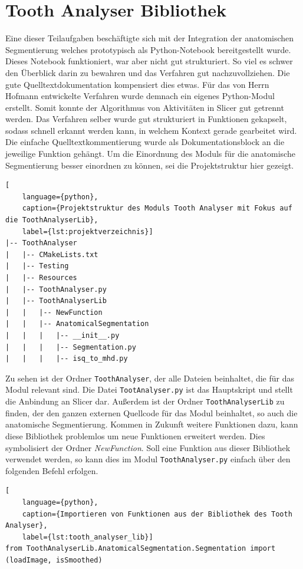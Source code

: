 \section{Tooth Analyser Bibliothek}
Eine dieser Teilaufgaben beschäftigte sich mit der Integration der anatomischen
Segmentierung welches prototypisch als Python-Notebook bereitgestellt wurde. Dieses
Notebook funktioniert, war aber nicht gut strukturiert. So viel es schwer den Überblick
darin zu bewahren und das Verfahren gut nachzuvollziehen. Die gute
Quelltextdokumentation kompensiert dies etwas. Für das von Herrn Hofmann entwickelte
Verfahren wurde demnach ein eigenes Python-Modul erstellt. Somit konnte der
Algorithmus von Aktivitäten in Slicer gut getrennt werden. Das Verfahren selber wurde
gut strukturiert in Funktionen gekapselt, sodass schnell erkannt werden kann, in
welchem Kontext gerade gearbeitet wird. Die einfache Quelltextkommentierung
wurde als Dokumentationsblock an die jeweilige Funktion gehängt. Um die Einordnung
des Moduls für die anatomische Segmentierung besser einordnen zu können, sei die
Projektstruktur hier gezeigt.

\begin{lstlisting}[
    language={python},
    caption={Projektstruktur des Moduls Tooth Analyser mit Fokus auf die ToothAnalyserLib},
    label={lst:projektverzeichnis}]
|-- ToothAnalyser
|   |-- CMakeLists.txt
|   |-- Testing
|   |-- Resources
|   |-- ToothAnalyser.py
|   |-- ToothAnalyserLib
|   |   |-- NewFunction
|   |   |-- AnatomicalSegmentation
|   |   |   |-- __init__.py
|   |   |   |-- Segmentation.py
|   |   |   |-- isq_to_mhd.py
\end{lstlisting}

Zu sehen ist der Ordner \texttt{ToothAnalyser}, der alle Dateien beinhaltet, die
für das Modul relevant sind. Die Datei \texttt{TootAnalyser.py} ist das
Hauptskript und stellt die Anbindung an Slicer dar. Außerdem ist der Ordner \texttt{ToothAnalyserLib}
zu finden, der den ganzen externen Quellcode für das Modul beinhaltet, so auch
die anatomische Segmentierung. Kommen in Zukunft weitere Funktionen dazu, kann
diese Bibliothek problemlos um neue Funktionen erweitert werden. Dies symbolisiert
der Ordner \textsl{NewFunction}. Soll eine Funktion aus dieser Bibliothek verwendet
werden, so kann dies im Modul \texttt{ToothAnalyser.py} einfach über den folgenden
Befehl erfolgen.

\begin{lstlisting}[
    language={python},
    caption={Importieren von Funktionen aus der Bibliothek des Tooth Analyser},
    label={lst:tooth_analyser_lib}]
from ToothAnalyserLib.AnatomicalSegmentation.Segmentation import (loadImage, isSmoothed)
\end{lstlisting}

